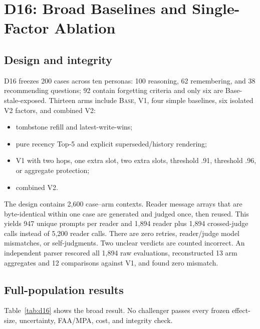\documentclass[10pt]{article}
\newcommand{\base}{\textsc{Base}\xspace}
\newcommand{\vone}{\textsc{V1}\xspace}
\newcommand{\vtwo}{\textsc{V2}\xspace}
\begin{document}
\section{D16: Broad Baselines and Single-Factor Ablation}

\subsection{Design and integrity}

D16 freezes 200 cases across ten personas: 100 reasoning, 62 remembering, and 38 recommending questions; 92 contain forgetting criteria and only six are Base-stale-exposed. Thirteen arms include \base, \vone, four simple baselines, six isolated \vtwo factors, and combined \vtwo:
\begin{itemize}
  \item tombstone refill and latest-write-wins;
  \item pure recency Top-5 and explicit superseded/history rendering;
  \item \vone with two hops, one extra slot, two extra slots, threshold .91, threshold .96, or aggregate protection;
  \item combined \vtwo.
\end{itemize}

The design contains 2,600 case--arm contexts. Reader message arrays that are byte-identical within one case are generated and judged once, then reused. This yields 947 unique prompts per reader and 1,894 reader plus 1,894 crossed-judge calls instead of 5,200 reader calls. There are zero retries, reader/judge model mismatches, or self-judgments. Two unclear verdicts are counted incorrect. An independent parser rescored all 1,894 raw evaluations, reconstructed 13 arm aggregates and 12 comparisons against \vone, and found zero mismatch.

\subsection{Full-population results}

Table~\ref{tab:d16} shows the broad result. No challenger passes every frozen effect-size, uncertainty, FAA/MPA, cost, and integrity check.
\end{document}
